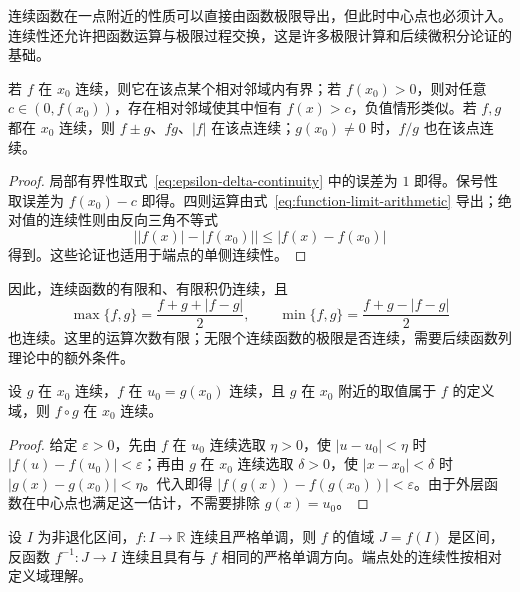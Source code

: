 连续函数在一点附近的性质可以直接由函数极限导出，但此时中心点也必须计入。连续性还允许把函数运算与极限过程交换，这是许多极限计算和后续微积分论证的基础。

\begin{proposition}[连续性的局部性质与运算]
\label{prop:local-properties-and-operations-of-continuity}
若 $f$ 在 $x_0$ 连续，则它在该点某个相对邻域内有界；若 $f(x_0)>0$，则对任意 $c\in(0,f(x_0))$，存在相对邻域使其中恒有 $f(x)>c$，负值情形类似。若 $f,g$ 都在 $x_0$ 连续，则 $f\pm g$、$fg$、$|f|$ 在该点连续；$g(x_0)\neq0$ 时，$f/g$ 也在该点连续。
\end{proposition}

\begin{proof}
局部有界性取式~\eqref{eq:epsilon-delta-continuity} 中的误差为 $1$ 即得。保号性取误差为 $f(x_0)-c$ 即得。四则运算由式~\eqref{eq:function-limit-arithmetic} 导出；绝对值的连续性则由反向三角不等式
\[
    \bigl||f(x)|-|f(x_0)|\bigr|\leq|f(x)-f(x_0)|
\]
得到。这些论证也适用于端点的单侧连续性。
\end{proof}

因此，连续函数的有限和、有限积仍连续，且
\[
    \max\{f,g\}=\frac{f+g+|f-g|}{2},
    \qquad \min\{f,g\}=\frac{f+g-|f-g|}{2}
\]
也连续。这里的运算次数有限；无限个连续函数的极限是否连续，需要后续函数列理论中的额外条件。

\begin{theorem}[复合函数的连续性]
\label{thm:composition-of-continuous-functions}
设 $g$ 在 $x_0$ 连续，$f$ 在 $u_0=g(x_0)$ 连续，且 $g$ 在 $x_0$ 附近的取值属于 $f$ 的定义域，则 $f\circ g$ 在 $x_0$ 连续。
\end{theorem}

\begin{proof}
给定 $\varepsilon>0$，先由 $f$ 在 $u_0$ 连续选取 $\eta>0$，使 $|u-u_0|<\eta$ 时 $|f(u)-f(u_0)|<\varepsilon$；再由 $g$ 在 $x_0$ 连续选取 $\delta>0$，使 $|x-x_0|<\delta$ 时 $|g(x)-g(x_0)|<\eta$。代入即得 $|f(g(x))-f(g(x_0))|<\varepsilon$。由于外层函数在中心点也满足这一估计，不需要排除 $g(x)=u_0$。
\end{proof}

\begin{theorem}[反函数的连续性]
\label{thm:continuity-of-inverse-functions}
设 $I$ 为非退化区间，$f:I\to\mathbb{R}$ 连续且严格单调，则 $f$ 的值域 $J=f(I)$ 是区间，反函数 $f^{-1}:J\to I$ 连续且具有与 $f$ 相同的严格单调方向。端点处的连续性按相对定义域理解。
\end{theorem}

